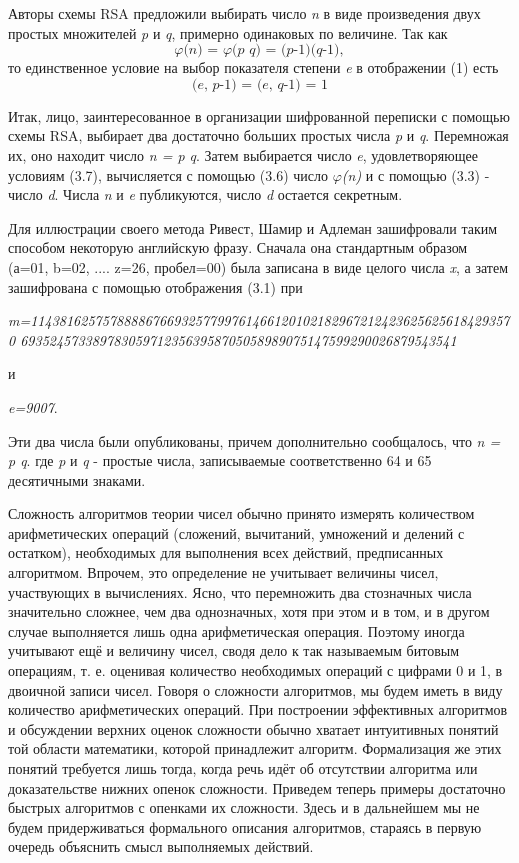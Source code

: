   Авторы схемы RSA предложили выбирать число \textit{n} в виде произведения двух простых множителей \textit{p} и \textit{q}, примерно одинаковых по 
величине. Так как 
\begin{equation}
 \textit{{$\varphi$}(n) = {$\varphi$}(p q) = (p-1)(q-1)},
\end{equation}
то единственное условие на выбор показателя степени \textit{e} в отображении (1) есть
\begin{equation}
 \textit{(e, p-1) = (e, q-1) = 1}
\end{equation}

  Итак, лицо, заинтересованное в организации шифрованной переписки с помощью схемы RSA, выбирает два достаточно больших простых числа \textit{p} и \textit{q}. 
Перемножая их, оно находит число \textit{n = p q}. Затем выбирается число \textit{e}, удовлетворяющее условиям (3.7), вычисляется с помощью (3.6) 
число \textit{{$\varphi$}(n)} и с помощью (3.3) - число \textit{d}. Числа \textit{n} и \textit{e} публикуются, число \textit{d} остается секретным. 

  Для иллюстрации своего метода Ривест, Шамир и Адлеман зашифровали таким способом некоторую английскую фразу. Сначала она стандартным образом 
(а=01, b=02, .... z=26, пробел=00) была записана в виде целого числа \textit{x}, а затем зашифрована с помощью отображения (3.1) при
\begin{center}
 \textit{m=11438162575788886766932577997614661201021829672124236256256184293570 6935245733897830597123563958705058989075147599290026879543541}
\end{center}
и 
\begin{center}
 \textit{e=9007}.
\end{center}
Эти два числа были опубликованы, причем дополнительно сообщалось, что \textit{n = p q}. где \textit{p} и \textit{q} - простые числа, записываемые 
соответственно 64 и 65 десятичными знаками. 

  Сложность алгоритмов теории чисел обычно принято измерять количеством арифметических операций (сложений, вычитаний, умножений и делений с остатком), 
необходимых для выполнения всех действий, предписанных алгоритмом. Впрочем, это определение не учитывает величины чисел, участвующих в вычислениях. 
Ясно, что перемножить два стозначных числа значительно сложнее, чем два однозначных, хотя при этом и в том, и в другом случае выполняется лишь одна 
арифметическая операция. Поэтому иногда учитывают ещё и величину чисел, сводя дело к так называемым битовым операциям, т. е. оценивая количество 
необходимых операций с цифрами 0 и 1, в двоичной записи чисел.
Говоря о сложности алгоритмов, мы будем иметь в виду количество арифметических операций. При построении эффективных алгоритмов и обсуждении верхних 
оценок сложности обычно хватает интуитивных понятий той области математики, которой принадлежит алгоритм. Формализация же этих понятий требуется лишь 
тогда, когда речь идёт об отсутствии алгоритма или доказательстве нижних опенок сложности.
Приведем теперь примеры достаточно быстрых алгоритмов с опенками их сложности. Здесь и в дальнейшем мы не будем придерживаться формального описания 
алгоритмов, стараясь в первую очередь объяснить смысл выполняемых действий.


